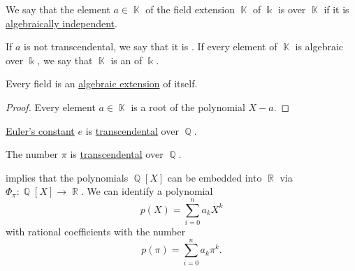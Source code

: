 \begin{definition}\label{def:transcendental_element}
  We say that the element \( a \in \BbbK \) of the field extension \( \BbbK \) of \( \Bbbk \) is  over \( \BbbK \) if it is \hyperref[def:algebraic_dependence]{algebraically independent}.

  If \( a \) is not transcendental, we say that it is . If every element of \( \BbbK \) is algebraic over \( \Bbbk \), we say that \( \BbbK \) is an  of \( \Bbbk \).
\end{definition}

\begin{proposition}\label{thm:field_is_algebraic_over_itself}
  Every field is an \hyperref[def:transcendental_element]{algebraic extension} of itself.
\end{proposition}
\begin{proof}
  Every element \( a \in \BbbK \) is a root of the polynomial \( X - a \).
\end{proof}

\begin{theorem}\label{thm:eulers_constant_is_transcendental}
  \hyperref[def:exponential_function]{Euler's constant} \( e \) is \hyperref[def:algebraic_element/transcendental]{transcendental} over \( \BbbQ \).
\end{theorem}

\begin{theorem}[Pi is transcendental]\label{thm:pi_is_transcendental}
  The number \hyperref[def:pi]{\( \pi \)} is \hyperref[def:algebraic_element/transcendental]{transcendental} over \( \BbbQ \).
\end{theorem}

\begin{example}\label{ex:polynomials_over_pi}
   implies that the polynomials \( \BbbQ[X] \) can be embedded into \( \BbbR \) via \( \Phi_\pi: \BbbQ[X] \to \BbbR \). We can identify a polynomial
  \begin{equation*}
    p(X) = \sum_{i=0}^n a_k X^k
  \end{equation*}
  with rational coefficients with the number
  \begin{equation*}
    p(\pi) = \sum_{i=0}^n a_k \pi^k.
  \end{equation*}
\end{example}

